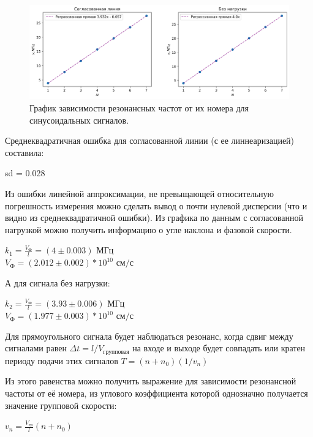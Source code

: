 \documentclass[a4paper,12pt]{article} %
\begin{document}
\begin{figure}[ht]
    \centering
    \includegraphics[width=1\linewidth]{plot/fig1.png}
    \caption{График зависимости резонансных частот от их номера для синусоидальных сигналов.}
\end{figure}

Среднеквадратичная ошибка для согласованной линии (с ее линнеаризацией) составила:
\begin{center}
    sd = 0.028
\end{center}

Из ошибки линейной аппроксимации, не превыщающей относительную погрешность измерения можно сделать вывод о почти нулевой дисперсии (что и видно из среднеквадратичной ошибки). Из графика по данным с согласованной нагрузкой можно получить информацию о угле наклона и фазовой скорости.

\begin{center}
    $k_1 = \frac{V_\text{Ф}}{l} = (4 \pm 0.003) \text{ МГц}$ \\
    $V_\text{Ф} = (2.012 \pm 0.002) * 10^{10} \text{ см/с}$
\end{center}

А для сигнала без нагрузки:
\begin{center}
    $k_2 = \frac{V_\text{Ф}}{l} = (3.93 \pm 0.006) \text{ МГц}$ \\
    $V_\text{Ф} = (1.977 \pm 0.003) * 10^{10} \text{ см/с}$
\end{center}


Для прямоугольного сигнала будет наблюдаться резонанс, когда сдвиг между сигналами равен $\Delta t = l / V_\text{групповая}$ на входе и выходе будет совпадать или кратен периоду подачи этих сигналов $T = (n + n_0)(1 / v_n)$

Из этого равенства можно получить выражение для зависимости резонансной частоты от её номера, из углового коэффициента которой однозначно получается значение групповой скорости:

\begin{center}
    \large{$v_n = \frac{V_\text{гр}}{l} (n + n_0)$}
\end{center}
\end{document}
